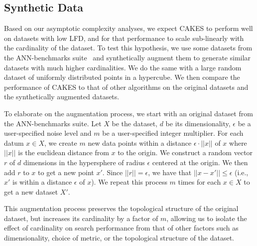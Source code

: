 \subsection{Synthetic Data}
\label{subsec:methods:synthetic-data}

Based on our asymptotic complexity analyses, we expect CAKES to perform well on datasets with low LFD, and for that performance to scale sub-linearly with the cardinality of the dataset.
To test this hypothesis, we use some datasets from the ANN-benchmarks suite~\cite{aumuller2020ann} and synthetically augment them to generate similar datasets with much higher cardinalities.
We do the same with a large random dataset of uniformly distributed points in a hypercube.
We then compare the performance of CAKES to that of other algorithms on the original datasets and the synthetically augmented datasets.

To elaborate on the augmentation process, we start with an original dataset from the ANN-benchmarks suite.
Let $X$ be the dataset, $d$ be its dimensionality, $\epsilon$ be a user-specified noise level and $m$ be a user-specified integer multiplier.
For each datum $x \in X$, we create $m$ new data points within a distance $\epsilon \cdot ||x||$ of $x$ where $||x||$ is the euclidean distance from $x$ to the origin.
We construct a random vector $r$ of $d$ dimensions in the hypersphere of radius $\epsilon$ centered at the origin.
We then add $r$ to $x$ to get a new point $x'$.
Since $||r|| = \epsilon$, we have that $||x - x'|| \leq \epsilon$ (i.e., $x'$ is within a distance $\epsilon$ of $x$).
We repeat this process $m$ times for each $x \in X$ to get a new dataset $X'$.

This augmentation process preserves the topological structure of the original dataset, but increases its cardinality by a factor of $m$, allowing us to isolate the effect of cardinality on search performance from that of other factors such as dimensionality, choice of metric, or the topological structure of the dataset.

